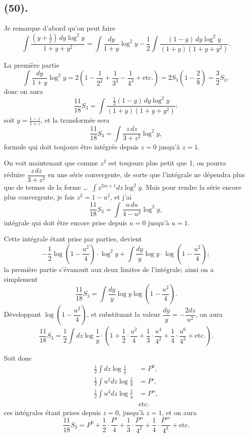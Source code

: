 \documentclass{article}
\begin{document}
\subsection*{(50).}

Je remarque d'abord qu'on peut faire
\[ \int\frac{(y+\frac{1}{2})\,dy\log^{2}y}{1+y+y^{2}}=\int\frac{dy}{1+y}\log^{2}y-\frac{1}{2}\int\frac{(1-y)\,dy\log^{2}y}{(1+y)(1+y+y^{2})}. \]

La première partie
\[ \int\frac{dy}{1+y}\log^{2}y=2\left(1-\frac{1}{2^{3}}+\frac{1}{3^{3}}-\frac{1}{4^{3}}+\text{etc.}\right)=2S_{3}\left(1-\frac{2}{8}\right)=\frac{3}{2}S_{3}, \]
donc on aura
\[ \frac{11}{18}S_{3}=\int\frac{\frac{1}{2}(1-y)\,dy\log^{2}y}{(1+y)(1+y+y^{2})}: \]
soit $y=\frac{1-z}{1+z}$, et la transformée sera
\[ \frac{11}{18}S_{3}=\int\frac{z\,dz}{3+z^{2}}\log^{2}y, \]
formule qui doit toujours être intégrée depuis $z=0$ jusqu'à $z=1$.

On voit maintenant que comme $z^{2}$ est toujours plus petit que 1, on pourra réduire $\dfrac{z\,dz}{3+z^{2}}$ en une série convergente, de sorte que l'intégrale ne dépendra plus que de termes de la forme \ldots\ $\displaystyle\int z^{2m+1}dz\log^{2}y$. Mais pour rendre la série encore plus convergente, je fais $z^{2}=1-u^{2}$, et j'ai
\[ \frac{11}{18}S_{3}=\int\frac{u\,du}{4-u^{2}}\log^{2}y, \]
intégrale qui doit être encore prise depuis $u=0$ jusqu'à $u=1$.

Cette intégrale étant prise par parties, devient
\[ -\frac{1}{2}\log\left(1-\frac{u^{2}}{4}\right)\cdot\log^{2}y+\int\frac{dy}{y}\log y\cdot\log\left(1-\frac{u^{2}}{4}\right); \]
la première partie s'évanouit aux deux limites de l'intégrale; ainsi on a simplement
\[ \frac{11}{18}S_{3}=\int\frac{dy}{y}\log y\log\left(1-\frac{u^{2}}{4}\right). \]
Développant $\log\left(1-\dfrac{u^{2}}{4}\right)$, et substituant la valeur $\dfrac{dy}{y}=-\dfrac{2dz}{u^{2}}$, on aura
\[ \frac{11}{18}S_{3}=\frac{1}{2}\int dz\log\frac{1}{y}\cdot\left(1+\frac{1}{2}\cdot\frac{u^{2}}{4}+\frac{1}{3}\cdot\frac{u^{4}}{4^{2}}+\frac{1}{4}\cdot\frac{u^{6}}{4^{3}}+\text{etc.}\right). \]

Soit donc
\[ \begin{aligned} \frac{1}{2}\int dz\log\frac{1}{y}&=P^{0},\\ \frac{1}{2}\int u^{2}dz\log\frac{1}{y}&=P',\\ \frac{1}{2}\int u^{4}dz\log\frac{1}{y}&=P'',\\ &\text{etc.} \end{aligned} \]
ces intégrales étant prises depuis $z=0$, jusqu'à $z=1$, et on aura
\[ \frac{11}{18}S_{3}=P^{0}+\frac{1}{2}\cdot\frac{P'}{4}+\frac{1}{3}\cdot\frac{P''}{4^{2}}+\frac{1}{4}\cdot\frac{P'''}{4^{3}}+\text{etc.} \]
\end{document}
